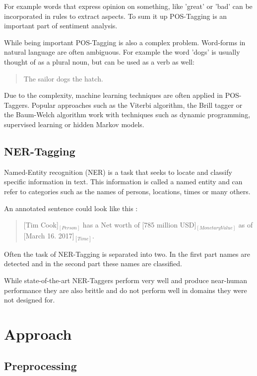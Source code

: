 \documentclass[10pt,a4paper]{article}
\begin{document}
		For example words that express opinion on something, like 'great' or 'bad' can be incorporated in rules to extract aspects. To sum it up POS-Tagging is an important part of sentiment analysis.
		
		While being important POS-Tagging is also a complex problem. Word-forms in natural language are often ambiguous. For example the word 'dogs' is usually thought of as a plural noun, but can be used as a verb as well:

		\begin{quote}
			The sailor dogs the hatch.
		\end{quote}

		Due to the complexity, machine learning techniques are often applied in POS-Taggers. Popular approaches such as the Viterbi algorithm, the Brill tagger or the Baum-Welch algorithm work with techniques such as dynamic programming, supervised learning or hidden Markov models.
		
		\subsection{NER-Tagging}
		
		Named-Entity recognition (NER) is a task that seeks to locate and classify specific information in text. This information is called a named entity and can refer to categories such as the names of persons, locations, times or many others.

		An annotated sentence could look like this :

		\begin{quote}
			[Tim Cook]$_{[Person]}$ has a Net worth of [785 million USD]$_{[Monetary Value]}$ as of [March 16. 2017]$_{[Time]}$.
		\end{quote}
		
		Often the task of NER-Tagging is separated into two. In the first part names are detected and in the second part these names are classified. 
		
		While state-of-the-art NER-Taggers perform very well and produce near-human performance they are also brittle and do not perform well in domains they were not designed for.
	
	\section{Approach}
		\subsection{Preprocessing}
	
\end{document}
